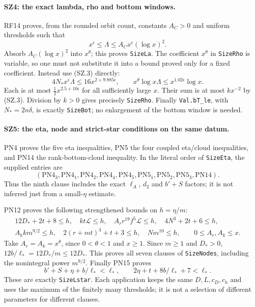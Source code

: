 \paragraph{SZ4: the exact lambda, rho and bottom windows.}
RF14 proves, from the rounded orbit count, constants $A_C>0$ and
uniform thresholds such that
\[
        x^\epsilon\leq\Lambda
                    \leq A_Cx^\epsilon(\log x)^2.
\]
Absorb $A_C(\log x)^2$ into $x^\theta$; this proves
\texttt{SizeLa}. The coefficient $x^\theta$ in
\texttt{SizeRho} is variable, so one must not substitute it into a
bound proved only for a fixed coefficient. Instead use (SZ.3) directly:
\[
 4N_*x^\epsilon\Lambda
       \leq16x^{2+9.885\epsilon},\qquad
 x^\theta\log x\Lambda
       \leq x^{1.02\epsilon}\log x.                            \tag{SZ.9}
\]
Each is at most $\frac12x^{2.5+10\epsilon}$ for all sufficiently
large $x$. Their sum is at most $k x^{-2}$ by (SZ.3).
Division by $k>0$ gives precisely \texttt{SizeRho}.
Finally \texttt{Val.bT\_le}, with $N_*=2n\delta$, is exactly
\texttt{SizeBot}; no enlargement of the bottom window is needed.

\paragraph{SZ5: the eta, node and strict-star conditions on the same datum.}
PN4 proves the five eta inequalities, PN5 the four coupled eta/cloud
inequalities, and PN14 the rank-bottom-cloud inequality. In the
literal order of \texttt{SizeEta}, the supplied entries are
\[
 (\mathrm{PN4}_3,\mathrm{PN4}_1,\mathrm{PN4}_2,
   \mathrm{PN4}_4,\mathrm{PN4}_5,
   \mathrm{PN5}_1,\mathrm{PN5}_2,\mathrm{PN5}_3,\mathrm{PN14}).
                                                                    \tag{SZ.10}
\]
Thus the ninth clause includes the exact $\ell_A$, $d_2$ and
$b'+S$ factors; it is not inferred just from a small-$\eta$ estimate.

PN12 proves the following strengthened bounds on $h=\eta/m$:
\[
 \begin{gathered}
 12D_*+2t+8\leq h,\quad kt\mathcal L\leq h,\quad
 A_r r^{19}f^5\mathcal L\leq h,\quad
 4N^3+2t+6\leq h,\\
 A_k k m^{9/2}\leq h,\quad
 2(r+mt)^3+t+3\leq h,\quad Nm^{10}\leq h,
 \qquad 0\leq A_r,A_k\leq x.
 \end{gathered}                                                    \tag{SZ.11}
\]
Take $A_r=A_k=x^\theta$, since $0<\theta<1$ and $x\geq1$.
Since $m\geq1$ and $D_*>0$,
$12b/\ell_*=12D_*/m\leq12D_*$. This proves all seven
clauses of \texttt{SizeNodes}, including the nonintegral power
$m^{9/2}$. Finally PN15 proves
\[
 b'+S+\eta+b/\ell_*<\ell_*,\qquad
                2\eta+t+8b/\ell_*+7<\ell_*.
\]
These are exactly \texttt{SizeLstar}. Each application keeps the
same $D,L,c_D,c_h$ and uses the maximum of the finitely many
thresholds; it is not a selection of different parameters for different
clauses.

